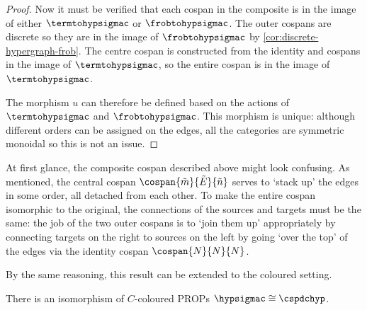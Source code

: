 \begin{proof}
    Now it must be verified that each cospan in the composite is in the image
    of either \(\termtohypsigmac\) or \(\frobtohypsigmac\).
    The outer cospans are discrete so they are in the image of
    \(\frobtohypsigmac\) by \cref{cor:discrete-hypergraph-frob}.
    The centre cospan is constructed from the identity and cospans in the image
    of \(\termtohypsigmac\), so the entire cospan is in the
    image of \(\termtohypsigmac\).

    The morphism \(u\) can therefore be defined based on the actions of
    \(\termtohypsigmac\) and \(\frobtohypsigmac\).
    This morphism is unique: although different orders can be assigned on the
    edges, all the categories are symmetric monoidal so this is not an issue.
\end{proof}

At first glance, the composite cospan described above might look confusing.
As mentioned, the central cospan \(\cospan{\tilde{m}}{\tilde{E}}{\tilde{n}}\)
serves to `stack up' the edges in some order, all detached from each other.
To make the entire cospan isomorphic to the original, the connections of the
sources and targets must be the same: the job of the two outer cospans is to
`join them up' appropriately by connecting targets on the right to sources on
the left by going `over the top' of the edges via the identity cospan
\(\cospan{N}{N}{N}\).

By the same reasoning, this result can be extended to the coloured setting.

\begin{corollary}
    There is an isomorphism of \(C\)-coloured PROPs
    \(\hypsigmac \cong \cspdchyp\).
\end{corollary}

\begin{example}
\end{example}